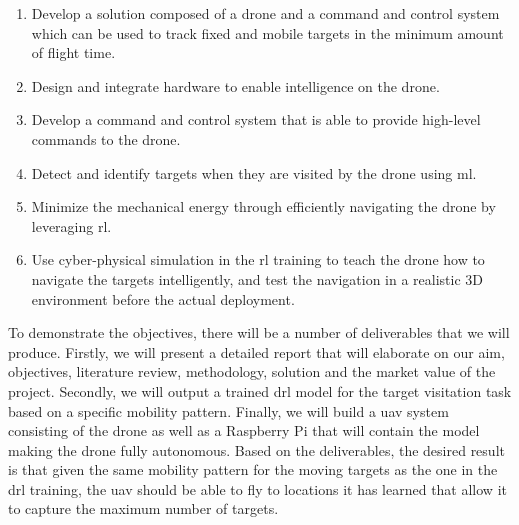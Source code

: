 \documentclass[../main.tex]{subfiles}
\begin{document}
\begin{enumerate}
    \item \label{obj:overview}
        Develop a solution composed of a drone and
        a command and control system which can be used
        to track fixed and mobile targets in the
        minimum amount of flight time.
    \item \label{obj:hardware} Design and integrate 
        hardware to enable 
        intelligence on the drone.
    \item Develop a command and control system that
        is able to provide high-level commands 
        to the drone.
    \item \label{obj:machine-learning} 
        Detect and identify
        targets when they are visited by the drone
        using \gls{ml}.
    \item \label{obj:drl} 
        Minimize the mechanical energy through efficiently
        navigating the drone by leveraging \gls{rl}.
    \item \label{obj:simulation} 
        Use cyber-physical simulation in the \gls{rl} training
        to teach the drone how to navigate the targets
        intelligently, and test the navigation in a realistic
        3D environment before the actual deployment.
\end{enumerate}

To demonstrate the objectives, there will be a number 
of deliverables that we will produce.
Firstly, we will present a detailed report 
that will elaborate on our aim, objectives, 
literature review, methodology,
solution and the market value of the project.
Secondly, we will output a trained \gls{drl} model for 
the target visitation task based on a specific
mobility pattern.
Finally, we will build a \gls{uav} system
consisting of the \anafi drone as well as a Raspberry Pi
that will contain the model making the
\anafi drone fully autonomous.
Based on the deliverables, the desired result is that
given the same mobility pattern for 
the moving targets as the one in the \gls{drl} training,
the \gls{uav} should be able to fly to locations it has learned
that allow it to capture the maximum number of targets. 
\end{document}
